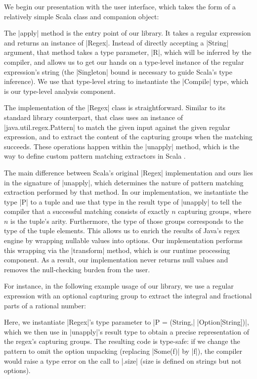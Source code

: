 We begin our presentation with the user interface, which takes the form of a relatively simple Scala class and companion object:

\regexUserLevel

The |apply| method is the entry point of our library.
It takes a regular expression and returns an instance of |Regex|.
Instead of directly accepting a |String| argument, that method takes a type parameter, |R|, which will be inferred by the compiler, and allows us to get our hands on a type-level instance of the regular expression's string (the |Singleton| bound is necessary to guide Scala's type inference).
We use that type-level string to instantiate the |Compile| type, which is our type-level analysis component.

The implementation of the |Regex| class is straightforward.
Similar to its standard library counterpart, that class uses an instance of |java.util.regex.Pattern| to match the given input against the given regular expression, and to extract the content of the capturing groups when the matching succeeds.
These operations happen within the |unapply| method, which is the way to define custom pattern matching extractors in Scala \citep{emir2007matching}.

The main difference between Scala's original |Regex| implementation and ours lies in the signature of |unapply|, which determines the nature of pattern matching extraction performed by that method.
In our implementation, we instantiate the type |P| to a tuple and use that type in the result type of |unapply| to tell the compiler that a successful matching consists of exactly $n$ capturing groups, where $n$ is the tuple's arity.
Furthermore, the type of those groups corresponds to the type of the tuple elements.
This allows us to enrich the results of Java's regex engine by wrapping nullable values into options.
Our implementation performs this wrapping via the |transform| method, which is our runtime processing component.
As a result, our implementation never returns null values and removes the null-checking burden from the user.

For instance, in the following example usage of our library, we use a regular expression with an optional capturing group to extract the integral and fractional parts of a rational number:

\regexRational

\noindent
Here, we instantiate |Regex|'s type parameter to |P = (String,| |Option[String])|, which we then use in |unapply|'s result type to obtain a precise representation of the regex's capturing groups.
The resulting code is type-safe: if we change the pattern to omit the option unpacking (replacing |Some(f)| by |f|), the compiler would raise a type error on the call to |.size| (size is defined on strings but not options).

